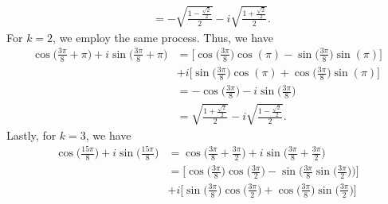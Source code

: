 \documentclass[a4paper]{article}
\begin{document}
\begin{enumerate}
\begin{solution}
\begin{align*}
                                                                                                                                                 &= - \sqrt{  \frac{ 1 - \frac{ \sqrt{ 2 }  }{ 2 }  }{ 2 }  }  - i \sqrt{ \frac{ 1 + \frac{ \sqrt{ 2 }  }{ 2 }  }{ 2 }   }.   
                \end{align*}
                For \( k = 2  \), we employ the same process. Thus, we have
                \begin{align*}
                    \cos \Big( \frac{ 3 \pi  }{ 8 } + \pi    \Big) + i \sin \Big(  \frac{ 3 \pi  }{ 8 }  + \pi \Big) &= \Big[ \cos \Big(  \frac{ 3 \pi  }{ 8  }  \Big) \cos (\pi) - \sin \Big(  \frac{  3 \pi  }{ 8 }  \Big) \sin (\pi)]     \\
                                                                                                                     &+ i \Big[ \sin \Big(  \frac{ 3 \pi }{ 8  }  \Big) \cos (\pi) + \cos \Big(  \frac{ 3 \pi  }{ 8 }  \Big) \sin (\pi)\Big] \\ 
                                                                                                                     &= - \cos \Big(  \frac{ 3 \pi  }{ 8  }  \Big) - i \sin \Big(  \frac{ 3 \pi  }{ 8  }  \Big) \\
                                                                                                                     &= \sqrt{ \frac{ 1 + \frac{ \sqrt{ 2 }  }{ 2 }  }{ 2 }  }  - i \sqrt{ \frac{ 1 - \frac{ \sqrt{ 2 }  }{ 2 }   }{ 2 }  }.
                \end{align*}
                Lastly, for \( k = 3  \), we have
                \begin{align*}
                    \cos \Big(  \frac{ 15 \pi  }{ 8  }  \Big) + i \sin \Big(  \frac{ 15 \pi  }{ 8 }  \Big) &= \cos \Big(  \frac{ 3 \pi  }{ 8 }  + \frac{ 3 \pi  }{  2  }  \Big) + i \sin \Big(  \frac{ 3 \pi  }{ 8  }  + \frac{ 3 \pi  }{  2  }  \Big) \\
                                                                                                           &= \Big[ \cos \Big(  \frac{ 3 \pi  }{  8  }   \Big) \cos \Big(  \frac{ 3 \pi  }{  2 }  \Big) - \sin \Big(  \frac{ 3 \pi  }{  8  } \sin \Big(  \frac{ 3 \pi }{ 2 }  \Big) \Big)\Big]  \\
                                                                                                           &+ i \Big[ \sin \Big(  \frac{ 3 \pi  }{ 8  } \Big)  \cos \Big(  \frac{ 3 \pi }{ 2 }  \Big)  + \cos \Big(  \frac{ 3 \pi  }{ 8  } \Big)  \sin \Big(  \frac{ 3 \pi  }{  2  }   \Big) \Big] \\

\end{align*}
\end{solution}
\end{enumerate}
\end{document}
